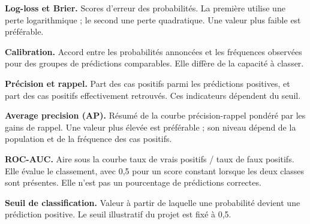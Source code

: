 \textbf{Log-loss et Brier.} Scores d'erreur des probabilités. La première utilise une
perte logarithmique ; le second une perte quadratique. Une valeur plus faible est préférable.

\textbf{Calibration.} Accord entre les probabilités annoncées et les fréquences
observées pour des groupes de prédictions comparables. Elle diffère de la capacité à classer.

\textbf{Précision et rappel.} Part des cas positifs parmi les prédictions positives,
et part des cas positifs effectivement retrouvés. Ces indicateurs dépendent du seuil.

\textbf{Average precision (AP).} Résumé de la courbe précision-rappel pondéré par les
gains de rappel. Une valeur plus élevée est préférable ; son niveau dépend de la
population et de la fréquence des cas positifs.

\textbf{ROC-AUC.} Aire sous la courbe taux de vrais positifs / taux de faux positifs.
Elle évalue le classement, avec 0,5 pour un score constant lorsque les deux classes
sont présentes. Elle n'est pas un pourcentage de prédictions correctes.

\textbf{Seuil de classification.} Valeur à partir de laquelle une probabilité devient
une prédiction positive. Le seuil illustratif du projet est fixé à 0,5.
